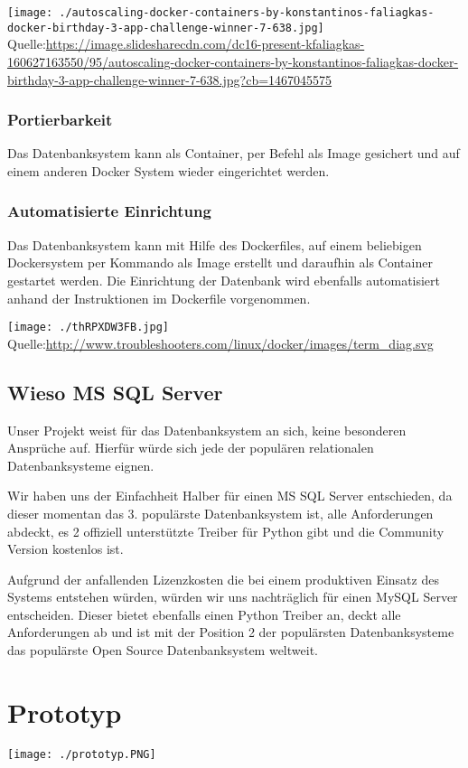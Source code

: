 \documentclass{sigchi}
\begin{document}
\texttt{[image: ./autoscaling-docker-containers-by-konstantinos-faliagkas-docker-birthday-3-app-challenge-winner-7-638.jpg]}
Quelle:\url{https://image.slidesharecdn.com/dc16-present-kfaliagkas-160627163550/95/autoscaling-docker-containers-by-konstantinos-faliagkas-docker-birthday-3-app-challenge-winner-7-638.jpg?cb=1467045575}

\subsubsection{Portierbarkeit}
Das Datenbanksystem kann als Container, per Befehl als Image gesichert und auf einem anderen Docker System wieder eingerichtet werden.

\subsubsection{Automatisierte Einrichtung}
Das Datenbanksystem kann mit Hilfe des Dockerfiles, auf einem beliebigen Dockersystem per Kommando als Image erstellt und daraufhin als Container gestartet werden. Die Einrichtung der Datenbank wird ebenfalls automatisiert anhand der Instruktionen im Dockerfile vorgenommen.

\texttt{[image: ./thRPXDW3FB.jpg]}
Quelle:\url{http://www.troubleshooters.com/linux/docker/images/term_diag.svg}

\subsection{Wieso MS SQL Server}
Unser Projekt weist für das Datenbanksystem an sich, keine besonderen Ansprüche auf. Hierfür würde sich jede der populären relationalen Datenbanksysteme eignen.

Wir haben uns der Einfachheit Halber für einen MS SQL Server entschieden, da dieser momentan das 3. populärste Datenbanksystem ist, alle Anforderungen abdeckt, es 2 offiziell unterstützte Treiber für Python gibt und die Community Version kostenlos ist. 

Aufgrund der anfallenden Lizenzkosten die bei einem produktiven Einsatz des Systems entstehen würden, würden wir uns nachträglich für einen MySQL Server entscheiden.
Dieser bietet ebenfalls einen Python Treiber an, deckt alle Anforderungen ab und ist mit der Position 2 der populärsten Datenbanksysteme das populärste Open Source Datenbanksystem weltweit.

\section{Prototyp}
\texttt{[image: ./prototyp.PNG]}
\end{document}
